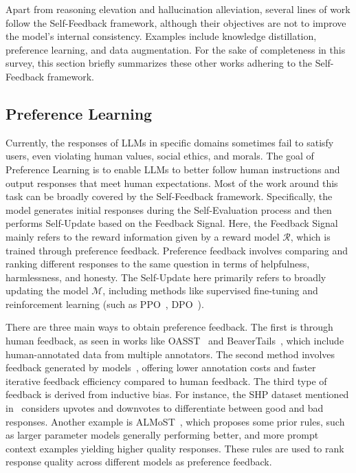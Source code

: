 \documentclass[lettersize,journal]{IEEEtran}
\begin{document}
\noindent Apart from reasoning elevation and hallucination alleviation, several lines of work follow the Self-Feedback framework, although their objectives are not to improve the model's internal consistency. Examples include knowledge distillation, preference learning, and data augmentation. For the sake of completeness in this survey, this section briefly summarizes these other works adhering to the Self-Feedback framework.


\subsection{Preference Learning} \label{subsec:PL}



\noindent Currently, the responses of LLMs in specific domains sometimes fail to satisfy users, even violating human values, social ethics, and morals. The goal of Preference Learning is to enable LLMs to better follow human instructions and output responses that meet human expectations. Most of the work around this task can be broadly covered by the Self-Feedback framework. Specifically, the model generates initial responses during the Self-Evaluation process and then performs Self-Update based on the Feedback Signal. Here, the Feedback Signal mainly refers to the reward information given by a reward model $\mathcal{R}$, which is trained through preference feedback. Preference feedback involves comparing and ranking different responses to the same question in terms of helpfulness, harmlessness, and honesty. The Self-Update here primarily refers to broadly updating the model $\mathcal{M}$, including methods like supervised fine-tuning and reinforcement learning (such as PPO~\cite{PPO_17_arXiv_OpenAI}, DPO~\cite{DPO_23_NIPS_Stanford}).

There are three main ways to obtain preference feedback. The first is through human feedback, as seen in works like OASST~\cite{OASST_23_NIPS_XX} and BeaverTails~\cite{BeaverTails_23_NIPS_PKU}, which include human-annotated data from multiple annotators. The second method involves feedback generated by models~\cite{ConstitutionalAI_22_arXiv_anthropic,SALMON_24_ICLR_IBM,RLAIF_22_arXiv_anthropic}, offering lower annotation costs and faster iterative feedback efficiency compared to human feedback. The third type of feedback is derived from inductive bias. For instance, the SHP dataset mentioned in~\cite{DataDifficult_22_PMLR_UoW} considers upvotes and downvotes to differentiate between good and bad responses. Another example is ALMoST~\cite{ALMoST_23_arXiv_NAVER}, which proposes some prior rules, such as larger parameter models generally performing better, and more prompt context examples yielding higher quality responses. These rules are used to rank response quality across different models as preference feedback.
\end{document}
